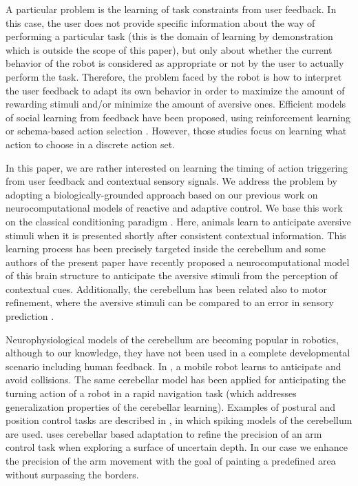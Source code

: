 \documentclass[letterpaper, 10 pt, conference]{ieeeconf}  %
\begin{document}
A particular problem is the learning of task constraints from user feedback. In this case, the user does not provide specific information about the way of performing a particular task (this is the domain of learning by demonstration which is outside the scope of this paper), but only about whether the current behavior of the robot is considered as appropriate or not by the user to actually perform the task. Therefore, the problem faced by the robot is how to interpret the user feedback to adapt its own behavior in order to maximize the amount of rewarding stimuli and/or minimize the amount of aversive ones. Efficient models of social learning from feedback have been proposed, using reinforcement learning \cite{blumberg2002integrated,isbell2001social} or schema-based action selection \cite{kaplan2002robotic}. However, those studies focus on learning what action to choose in a discrete action set.

In this paper, we are rather interested on learning the timing of action triggering from user feedback and contextual sensory signals. We address the problem by adopting a biologically-grounded approach based on our previous work on neurocomputational models of reactive and adaptive control. We base this work on the classical conditioning paradigm \cite{pavlov1927conditioned}. Here, animals learn to anticipate aversive stimuli when it is presented shortly after consistent contextual information. This learning process has been precisely targeted inside the cerebellum \cite{christian2003neural, yeo1998cerebellum} and some authors of the present paper have recently proposed a neurocomputational model of this brain structure \cite{herreros2013nucleo} to anticipate the aversive stimuli from the perception of contextual cues. Additionally, the cerebellum has been related also to motor refinement, where the aversive stimuli can be compared to an error in sensory prediction \cite{houk2003}.

Neurophysiological models of the cerebellum are becoming popular in robotics, although to our knowledge, they have not been used in a complete developmental scenario including human feedback. In \cite{hofstoetter2002cerebellum}, a mobile robot learns to anticipate and avoid collisions. The same cerebellar model has been applied for anticipating the turning action of a robot in a rapid navigation task  \cite{herreros2013speed} (which addresses generalization properties of the cerebellar learning). Examples of postural and position control tasks are described in \cite{pinzon2015realistic}, in which spiking models of the cerebellum are used. \cite{barron2013cerebellum} uses cerebellar based adaptation to refine the precision of an arm control task when exploring a surface of uncertain depth. In our case we enhance the precision of the arm movement with the goal of painting a predefined area without surpassing the borders.  
\end{document}
